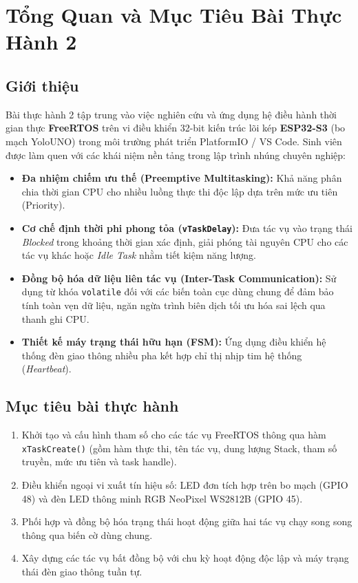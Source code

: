 \setcounter{table}{0}
\section{Tổng Quan và Mục Tiêu Bài Thực Hành 2}

\subsection{Giới thiệu}
Bài thực hành 2 tập trung vào việc nghiên cứu và ứng dụng hệ điều hành thời gian thực \textbf{FreeRTOS} trên vi điều khiển 32-bit kiến trúc lõi kép \textbf{ESP32-S3} (bo mạch YoloUNO) trong môi trường phát triển PlatformIO / VS Code. Sinh viên được làm quen với các khái niệm nền tảng trong lập trình nhúng chuyên nghiệp:
\begin{itemize}
    \item \textbf{Đa nhiệm chiếm ưu thế (Preemptive Multitasking):} Khả năng phân chia thời gian CPU cho nhiều luồng thực thi độc lập dựa trên mức ưu tiên (Priority).
    \item \textbf{Cơ chế định thời phi phong tỏa (\texttt{vTaskDelay}):} Đưa tác vụ vào trạng thái \textit{Blocked} trong khoảng thời gian xác định, giải phóng tài nguyên CPU cho các tác vụ khác hoặc \textit{Idle Task} nhằm tiết kiệm năng lượng.
    \item \textbf{Đồng bộ hóa dữ liệu liên tác vụ (Inter-Task Communication):} Sử dụng từ khóa \texttt{volatile} đối với các biến toàn cục dùng chung để đảm bảo tính toàn vẹn dữ liệu, ngăn ngừa trình biên dịch tối ưu hóa sai lệch qua thanh ghi CPU.
    \item \textbf{Thiết kế máy trạng thái hữu hạn (FSM):} Ứng dụng điều khiển hệ thống đèn giao thông nhiều pha kết hợp chỉ thị nhịp tim hệ thống (\textit{Heartbeat}).
\end{itemize}

\subsection{Mục tiêu bài thực hành}
\begin{enumerate}
    \item Khởi tạo và cấu hình tham số cho các tác vụ FreeRTOS thông qua hàm \texttt{xTaskCreate()} (gồm hàm thực thi, tên tác vụ, dung lượng Stack, tham số truyền, mức ưu tiên và task handle).
    \item Điều khiển ngoại vi xuất tín hiệu số: LED đơn tích hợp trên bo mạch (GPIO 48) và đèn LED thông minh RGB NeoPixel WS2812B (GPIO 45).
    \item Phối hợp và đồng bộ hóa trạng thái hoạt động giữa hai tác vụ chạy song song thông qua biến cờ dùng chung.
    \item Xây dựng các tác vụ bất đồng bộ với chu kỳ hoạt động độc lập và máy trạng thái đèn giao thông tuần tự.
\end{enumerate}

